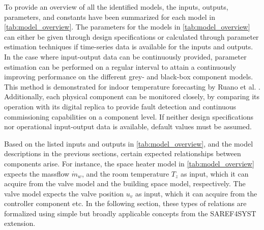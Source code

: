 To provide an overview of all the identified models, the inputs, outputs, parameters, and constants have been summarized for each model in \autoref{tab:model_overview}. The parameters for the models in \autoref{tab:model_overview} can either be given through design specifications or calculated through parameter estimation techniques if time-series data is available for the inputs and outputs. In the case where input-output data can be continuously provided, parameter estimation can be performed on a regular interval to attain a continuously improving performance on the different grey- and black-box component models. This method is demonstrated for indoor temperature forecasting by Ruano et al. \cite{RUANO2006682}.
Additionally, each physical component can be monitored closely, by comparing its operation with its digital replica to provide fault detection and continuous commissioning capabilities on a component level. If neither design specifications nor operational input-output data is available, default values must be assumed. 




Based on the listed inputs and outputs in \autoref{tab:model_overview}, and the model descriptions in the previous sections, certain expected relationships between components arise. For instance, the space heater model in \autoref{tab:model_overview} expects the massflow $\dot{m}_w$, and the room temperature $T_{z}$ as input, which it can acquire from the valve model and the building space model, respectively. The valve model expects the valve position $u_v$ as input, which it can acquire from the controller component etc. In the following section, these types of relations are formalized using simple but broadly applicable concepts from the SAREF4SYST extension. 



